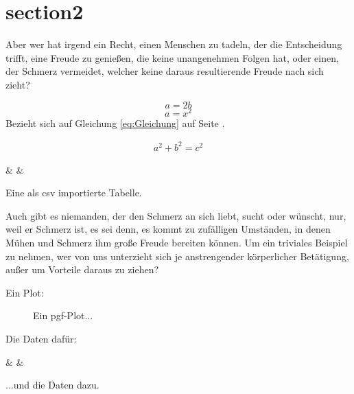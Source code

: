 \section{section2}
	Aber wer hat irgend ein Recht, einen Menschen zu tadeln, der die Entscheidung trifft, eine Freude zu genießen, die keine unangenehmen Folgen hat, oder einen, der Schmerz vermeidet, welcher keine daraus resultierende Freude nach sich zieht?
	
	\begin{equation}\label{eq:Gleichung}
		a=2b
	\end{equation}
	\begin{equation}
		a=x^2
	\end{equation}
	Bezieht sich auf Gleichung \ref{eq:Gleichung} auf Seite \pageref{eq:Gleichung}.
	
	\begin{thm}[Pythagoras]\label{thm:Pythagoras}
		\begin{gather}
			a^2 + b^2 = c^2
		\end{gather}	
	\end{thm}
	
	\begin{table}[h] %
		\centering	
		{\thecsvrow & \lastname & \givenname}%
		\caption[CSV Import]{Eine als csv importierte Tabelle.}
		\label{tab:Tabelle1}
	\end{table}

	Auch gibt es niemanden, der den Schmerz an sich liebt, sucht oder wünscht, nur, weil er Schmerz ist, es sei denn, es kommt zu zufälligen Umständen, in denen Mühen und Schmerz ihm große Freude bereiten können. Um ein triviales Beispiel zu nehmen, wer von uns unterzieht sich je anstrengender körperlicher Betätigung, außer um Vorteile daraus zu ziehen?

	\newpage
	
	Ein Plot:
	\begin{figure}[h]
		\centering
		\scalebox{.8}{}
		\caption{Ein pgf-Plot...}
		\label{fig:pgfplot}
	\end{figure}
	
	Die Daten dafür:
	\begin{table}[h] %
		\centering	
		{\thecsvrow & \x & \y}%
		\caption[Daten]{...und die Daten dazu.}
		\label{tab:pgfplot}
	\end{table}
	
